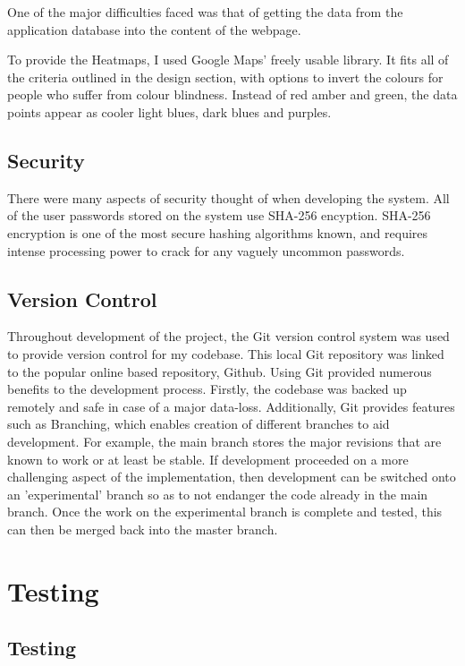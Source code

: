 \documentclass{l4proj}
\begin{document}
One of the major difficulties faced was that of getting the data from the application database into the content of the webpage.

To provide the Heatmaps, I used Google Maps' freely usable library. It fits all of the criteria outlined in the design section, with options to invert the colours for people who suffer from colour blindness. Instead of red amber and green, the data points appear as cooler light blues, dark blues and purples.

\section{Security}

There were many aspects of security thought of when developing the system. All of the user passwords stored on the system use SHA-256 encyption. SHA-256 encryption is one of the most secure hashing algorithms known, and requires intense processing power to crack for any vaguely uncommon passwords. 

\section{Version Control}

Throughout development of the project, the Git version control system was used to provide version control for my codebase. This local Git repository was linked to the popular online based repository, Github.  Using Git provided numerous benefits to the development process. Firstly, the codebase was backed up remotely and safe in case of a major data-loss. Additionally, Git provides features such as Branching, which enables creation of different branches to aid development. For example, the main branch stores the major revisions that are known to work or at least be stable. If development proceeded on a more challenging aspect of the implementation, then development can be switched onto an 'experimental' branch so as to not endanger the code already in the main branch. Once the work on the experimental branch is complete and tested, this can then be merged back into the master branch.


\chapter{Testing}

\section{Testing}
\end{document}
